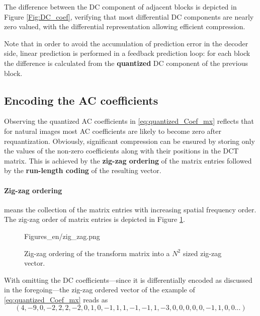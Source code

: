 The difference between the DC component of adjacent blocks is depicted in Figure \ref{Fig:DC_coef}, verifying that most differential DC components are nearly zero valued, with the differential representation allowing efficient compression.

Note that in order to avoid the accumulation of prediction error in the decoder side, linear prediction is performed in a feedback prediction loop: for each block the difference is calculated from the \textbf{quantized} DC component of the previous block.

\subsection{Encoding the AC coefficients}

Observing the quantized AC coefficients in \eqref{eq:quantized_Coef_mx} reflects that for natural images most AC coefficients are likely to become zero after requantization.
Obviously, significant compression can be ensured by storing only the values of the non-zero coefficients along with their positions in the DCT matrix.
This is achieved by the \textbf{zig-zag ordering} of the matrix entries followed by the \textbf{run-length coding} of the resulting vector.

\paragraph{Zig-zag ordering} means the collection of the matrix entries with increasing spatial frequency order.
The zig-zag order of matrix entries is depicted in Figure \ref{Fig:zig_zag}.
\begin{figure}[h!]
	\centering
	\begin{minipage}[c]{0.5\textwidth}
	\begin{overpic}[width = 0.8\columnwidth ]{Figures_en/zig_zag.png}
	\end{overpic}   \end{minipage}\hfill
		\begin{minipage}[c]{0.45\textwidth}
	\caption{Zig-zag ordering of the transform matrix into a $N^2$ sized zig-zag vector.}
	\label{Fig:zig_zag}  \end{minipage}
\end{figure}
With omitting the DC coefficients---since it is differentially encoded as discussed in the foregoing---the zig-zag ordered vector of the example of \eqref{eq:quantized_Coef_mx} reads as
\begin{equation}
\left( 4, -9, 0, -2, 2, 2, -2, 0, 1, 0, -1, 1, 1, -1, -1, 1, -3, 0,0,0,0,0,-1, 1, 0,0...\right)
\label{eq:zig_zag_example}
\end{equation}

